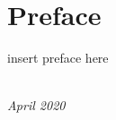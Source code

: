 \chapter*{Preface}


insert preface here

\begin{flushright}
{\makeatletter\itshape
    \@author \\
    
    April 2020
\makeatother}
\end{flushright}
